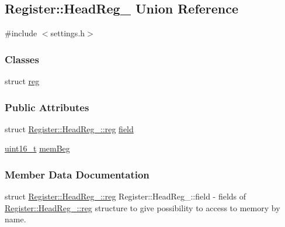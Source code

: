 \hypertarget{unionRegister_1_1HeadReg__}{}\subsection{Register\+:\+:Head\+Reg\+\_\+ Union Reference}
\label{unionRegister_1_1HeadReg__}


{\ttfamily \#include $<$settings.\+h$>$}

\subsubsection*{Classes}
\begin{DoxyCompactItemize}
\item 
struct \mbox{\hyperlink{structRegister_1_1HeadReg___1_1reg}{reg}}
\end{DoxyCompactItemize}
\subsubsection*{Public Attributes}
\begin{DoxyCompactItemize}
\item 
struct \mbox{\hyperlink{structRegister_1_1HeadReg___1_1reg}{Register\+::\+Head\+Reg\+\_\+\+::reg}} \mbox{\hyperlink{unionRegister_1_1HeadReg___a518bfb02eceaa80843dfa3bc5ec6f9ac}{field}}
\item 
\mbox{\hyperlink{settings_8h_a017dd44e68049ffdd31500a8cd01ba68}{uint16\+\_\+t}} \mbox{\hyperlink{unionRegister_1_1HeadReg___a0ec342c05f7dc7716557d9b2cef7dfd6}{mem\+Beg}}
\end{DoxyCompactItemize}


\subsubsection{Member Data Documentation}
\mbox{\label{unionRegister_1_1HeadReg___a518bfb02eceaa80843dfa3bc5ec6f9ac}} 
{\footnotesize\ttfamily struct \mbox{\hyperlink{structRegister_1_1HeadReg___1_1reg}{Register\+::\+Head\+Reg\+\_\+\+::reg}} Register\+::\+Head\+Reg\+\_\+\+::\texorpdfstring{field}{field}} - fields of \hyperlink{structRegister_1_1HeadReg___1_1reg}{Register\+::\+Head\+Reg\+\_\+\+::reg} structure to give possibility to access to memory by name.  

